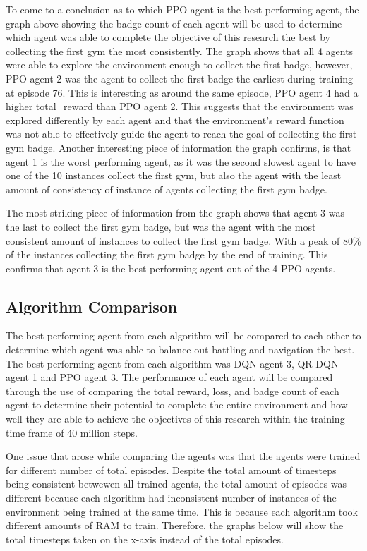 To come to a conclusion as to which PPO agent is the best performing agent, the graph above showing the badge count of each agent will be used to determine which agent was able to complete the objective of this research the best by collecting the first gym the most consistently. The graph shows that all 4 agents were able to explore the environment enough to collect the first badge, however, PPO agent 2 was the agent to collect the first badge the earliest during training at episode 76. This is interesting as around the same episode, PPO agent 4 had a higher total\_reward than PPO agent 2. This suggests that the environment was explored differently by each agent and that the environment's reward function was not able to effectively guide the agent to reach the goal of collecting the first gym badge. Another interesting piece of information the graph confirms, is that agent 1 is the worst performing agent, as it was the second slowest agent to have one of the 10 instances collect the first gym, but also the agent with the least amount of consistency of instance of agents collecting the first gym badge. 

The most striking piece of information from the graph shows that agent 3 was the last to collect the first gym badge, but was the agent with the most consistent amount of instances to collect the first gym badge. With a peak of 80\% of the instances collecting the first gym badge by the end of training. This confirms that agent 3 is the best performing agent out of the 4 PPO agents.

\subsection{Algorithm Comparison}

The best performing agent from each algorithm will be compared to each other to determine which agent was able to balance out battling and navigation the best. The best performing agent from each algorithm was DQN agent 3, QR-DQN agent 1 and PPO agent 3. The performance of each agent will be compared through the use of comparing the total reward, loss, and badge count of each agent to determine their potential to complete the entire environment and how well they are able to achieve the objectives of this research within the training time frame of 40 million steps.

One issue that arose while comparing the agents was that the agents were trained for different number of total episodes. Despite the total amount of timesteps being consistent betwewen all trained agents, the total amount of episodes was different because each algorithm had inconsistent number of instances of the environment being trained at the same time. This is because each algorithm took different amounts of RAM to train. Therefore, the graphs below will show the total timesteps taken on the x-axis instead of the total episodes.

